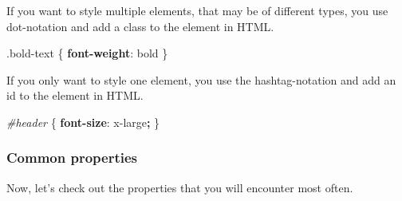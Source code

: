 \documentclass[
]{article}
\newenvironment{Shaded}{\begin{snugshade}}{\end{snugshade}}
\newcommand{\DecValTok}[1]{\textcolor[rgb]{0.00,0.00,0.81}{#1}}
\newcommand{\FunctionTok}[1]{\textcolor[rgb]{0.00,0.00,0.00}{#1}}
\newcommand{\KeywordTok}[1]{\textcolor[rgb]{0.13,0.29,0.53}{\textbf{#1}}}
\newcommand{\NormalTok}[1]{#1}
\newcommand{\OperatorTok}[1]{\textcolor[rgb]{0.81,0.36,0.00}{\textbf{#1}}}
\newcommand{\PreprocessorTok}[1]{\textcolor[rgb]{0.56,0.35,0.01}{\textit{#1}}}
\begin{document}
If you want to style multiple elements, that may be of different types, you use dot-notation and add a class to the element in HTML.

\begin{Shaded}
\begin{Highlighting}[]
\FunctionTok{.bold-text}\NormalTok{ \{                           }
  \KeywordTok{font-weight}\NormalTok{: }\DecValTok{bold}
\NormalTok{\}}
\end{Highlighting}
\end{Shaded}

If you only want to style one element, you use the hashtag-notation and add an id to the element in HTML.

\begin{Shaded}
\begin{Highlighting}[]
\PreprocessorTok{#header}\NormalTok{ \{                           }
  \KeywordTok{font-size}\NormalTok{: }\DecValTok{x-large}\OperatorTok{;}
\NormalTok{\}}
\end{Highlighting}
\end{Shaded}

\hypertarget{common-properties}{%
\subsubsection*{Common properties}\label{common-properties}}

Now, let's check out the properties that you will encounter most often.
\end{document}
